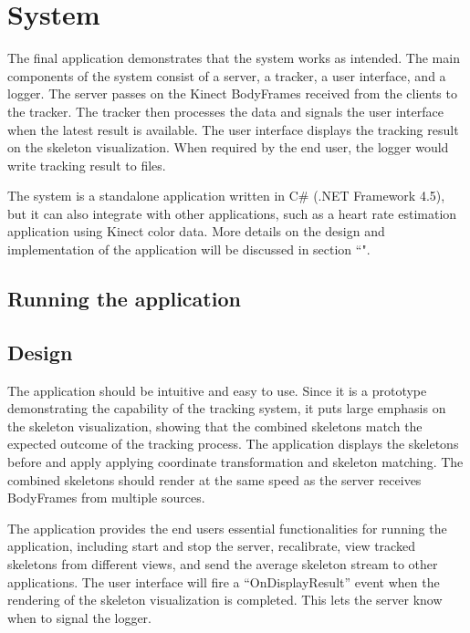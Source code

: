 \documentclass{sigchi}
\begin{document}
\section{System}
\label{sec:system}

The final application demonstrates that the system works as intended. The main components of the system consist of a server, a tracker, a user interface, and a logger. The server passes on the Kinect BodyFrames received from the clients to the tracker. The tracker then processes the data and signals the user interface when the latest result is available. The user interface displays the tracking result on the skeleton visualization. When required by the end user, the logger would write tracking result to files.

The system is a standalone application written in C\# (.NET Framework 4.5), but it can also integrate with other applications, such as a heart rate estimation application using Kinect color data. More details on the design and implementation of the application will be discussed in section ``".

\subsection{Running the application}

\subsection{Design}

The application should be intuitive and easy to use. Since it is a prototype demonstrating the capability of the tracking system, it puts large emphasis on the skeleton visualization, showing that the combined skeletons match the expected outcome of the tracking process. The application displays the skeletons before and apply applying coordinate transformation and skeleton matching. The combined skeletons should render at the same speed as the server receives BodyFrames from multiple sources. 

The application provides the end users essential functionalities for running the application, including start and stop the server, recalibrate, view tracked skeletons from different views, and send the average skeleton stream to other applications. The user interface will fire a ``OnDisplayResult'' event when the rendering of the skeleton visualization is completed. This lets the server know when to signal the logger.
\end{document}
